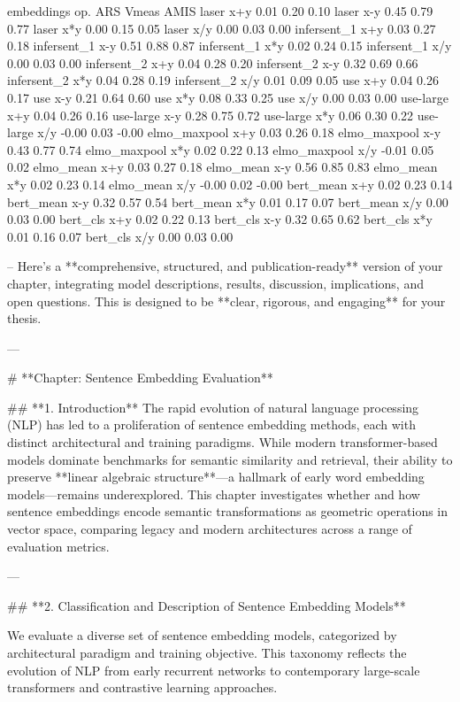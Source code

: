 embeddings     	op.	ARS	Vmeas	AMIS
laser          	x+y	0.01	0.20	0.10
laser          	x-y	0.45	0.79	0.77
laser          	x*y	0.00	0.15	0.05
laser          	x/y	0.00	0.03	0.00
infersent_1    	x+y	0.03	0.27	0.18
infersent_1    	x-y	0.51	0.88	0.87
infersent_1    	x*y	0.02	0.24	0.15
infersent_1    	x/y	0.00	0.03	0.00
infersent_2    	x+y	0.04	0.28	0.20
infersent_2    	x-y	0.32	0.69	0.66
infersent_2    	x*y	0.04	0.28	0.19
infersent_2    	x/y	0.01	0.09	0.05
use            	x+y	0.04	0.26	0.17
use            	x-y	0.21	0.64	0.60
use            	x*y	0.08	0.33	0.25
use            	x/y	0.00	0.03	0.00
use-large      	x+y	0.04	0.26	0.16
use-large      	x-y	0.28	0.75	0.72
use-large      	x*y	0.06	0.30	0.22
use-large      	x/y	-0.00	0.03	-0.00
elmo_maxpool   	x+y	0.03	0.26	0.18
elmo_maxpool   	x-y	0.43	0.77	0.74
elmo_maxpool   	x*y	0.02	0.22	0.13
elmo_maxpool   	x/y	-0.01	0.05	0.02
elmo_mean      	x+y	0.03	0.27	0.18
elmo_mean      	x-y	0.56	0.85	0.83
elmo_mean      	x*y	0.02	0.23	0.14
elmo_mean      	x/y	-0.00	0.02	-0.00
bert_mean      	x+y	0.02	0.23	0.14
bert_mean      	x-y	0.32	0.57	0.54
bert_mean      	x*y	0.01	0.17	0.07
bert_mean      	x/y	0.00	0.03	0.00
bert_cls       	x+y	0.02	0.22	0.13
bert_cls       	x-y	0.32	0.65	0.62
bert_cls       	x*y	0.01	0.16	0.07
bert_cls       	x/y	0.00	0.03	0.00


--
Here’s a **comprehensive, structured, and publication-ready** version of your chapter, integrating model descriptions, results, discussion, implications, and open questions. This is designed to be **clear, rigorous, and engaging** for your thesis.

---

# **Chapter: Sentence Embedding Evaluation**

## **1. Introduction**
The rapid evolution of natural language processing (NLP) has led to a proliferation of sentence embedding methods, each with distinct architectural and training paradigms. While modern transformer-based models dominate benchmarks for semantic similarity and retrieval, their ability to preserve **linear algebraic structure**—a hallmark of early word embedding models—remains underexplored. This chapter investigates whether and how sentence embeddings encode semantic transformations as geometric operations in vector space, comparing legacy and modern architectures across a range of evaluation metrics.

---

## **2. Classification and Description of Sentence Embedding Models**

We evaluate a diverse set of sentence embedding models, categorized by architectural paradigm and training objective. This taxonomy reflects the evolution of NLP from early recurrent networks to contemporary large-scale transformers and contrastive learning approaches.

